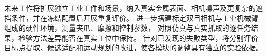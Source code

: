 \documentclass[UTF8,fontset=fandol,a4paper,11pt]{ctexart}
\begin{document}
未来工作将扩展独立工业工件和场景，纳入真实金属表面、相机噪声及更复杂的遮挡条件，并在冻结配置后开展重复评价。
进一步搭建标定双目相机与工业机械臂组成的硬件环境，测量夹爪、摩擦和控制参数，
对照仿真与真实抓取的逐任务结果，检验方法差异能否在真实工位中保持。
针对已发现的失败类型，将分别评价目标点提取、候选适配和运动规划的改进，使各模块的调整具有独立的实验依据。

\begingroup
\small


\endgroup
\end{document}

